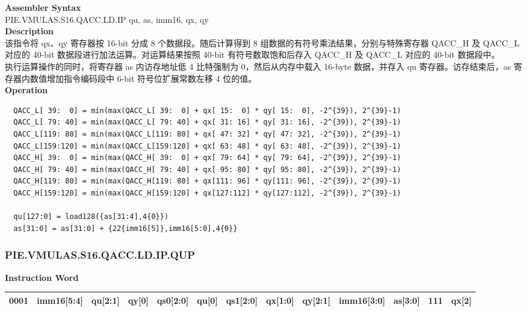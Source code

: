 \textbf{Assembler Syntax} \\
PIE.VMULAS.S16.QACC.LD.IP qu, as, imm16, qx, qy \\
\textbf{Description} \\
该指令将 qx、qy 寄存器按 16-bit 分成 8 个数据段。随后计算得到 8 组数据的有符号乘法结果，分别与特殊寄存器 QACC\_H 及 QACC\_L 对应的 40-bit 数据段进行加法运算。对运算结果按照 40-bit 有符号数取饱和后存入 QACC\_H 及 QACC\_L 对应的 40-bit 数据段中。\\
执行运算操作的同时，将寄存器 as 内访存地址低 4 比特强制为 0，然后从内存中载入 16-byte 数据，并存入 qu 寄存器。访存结束后，as 寄存器内数值增加指令编码段中 6-bit 符号位扩展常数左移 4 位的值。\\
\textbf{Operation}
\begin{lstlisting}
  QACC_L[ 39:  0] = min(max(QACC_L[ 39:  0] + qx[ 15:  0] * qy[ 15:  0], -2^{39}), 2^{39}-1)
  QACC_L[ 79: 40] = min(max(QACC_L[ 79: 40] + qx[ 31: 16] * qy[ 31: 16], -2^{39}), 2^{39}-1)
  QACC_L[119: 80] = min(max(QACC_L[119: 80] + qx[ 47: 32] * qy[ 47: 32], -2^{39}), 2^{39}-1)
  QACC_L[159:120] = min(max(QACC_L[159:120] + qx[ 63: 48] * qy[ 63: 48], -2^{39}), 2^{39}-1)
  QACC_H[ 39:  0] = min(max(QACC_H[ 39:  0] + qx[ 79: 64] * qy[ 79: 64], -2^{39}), 2^{39}-1)
  QACC_H[ 79: 40] = min(max(QACC_H[ 79: 40] + qx[ 95: 80] * qy[ 95: 80], -2^{39}), 2^{39}-1)
  QACC_H[119: 80] = min(max(QACC_H[119: 80] + qx[111: 96] * qy[111: 96], -2^{39}), 2^{39}-1)
  QACC_H[159:120] = min(max(QACC_H[159:120] + qx[127:112] * qy[127:112], -2^{39}), 2^{39}-1)

  qu[127:0] = load128({as[31:4],4{0}})
  as[31:0] = as[31:0] + {22{imm16[5]},imm16[5:0],4{0}}
\end{lstlisting}

\newpage
\subsubsection{PIE.VMULAS.S16.QACC.LD.IP.QUP}\label{instruction:PIEVMULASS16QACCLDIPQUP}
\setlength\tabcolsep{5pt}
\textbf{Instruction Word} \\
\begin{tabular}{|c|c|c|c|c|c|c|c|c|c|c|c|c|}
	\hline
	0001 & imm16[5:4] & qu[2:1] & qy[0] & qs0[2:0] & qu[0] & qs1[2:0] & qx[1:0] & qy[2:1] & imm16[3:0] & as[3:0] & 111 & qx[2] \\
	\hline
\end{tabular}

